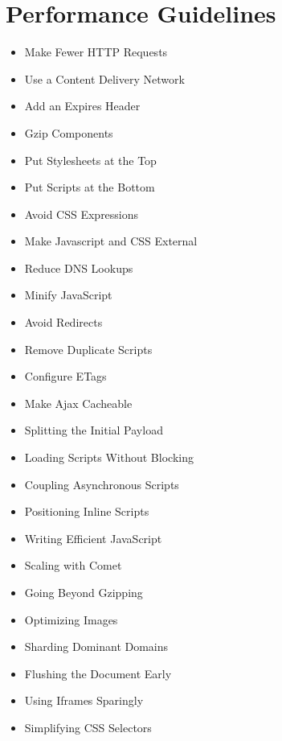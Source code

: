\section{Performance Guidelines}
\label{section:performance-guidelines}

\begin{itemize}
\item Make Fewer HTTP Requests
\item Use a Content Delivery Network
\item Add an Expires Header
\item Gzip Components
\item Put Stylesheets at the Top
\item Put Scripts at the Bottom
\item Avoid CSS Expressions
\item Make Javascript and CSS External
\item Reduce DNS Lookups
\item Minify JavaScript
\item Avoid Redirects
\item Remove Duplicate Scripts
\item Configure ETags
\item Make Ajax Cacheable
\item Splitting the Initial Payload
\item Loading Scripts Without Blocking
\item Coupling Asynchronous Scripts
\item Positioning Inline Scripts
\item Writing Efficient JavaScript
\item Scaling with Comet
\item Going Beyond Gzipping
\item Optimizing Images
\item Sharding Dominant Domains
\item Flushing the Document Early
\item Using Iframes Sparingly
\item Simplifying CSS Selectors
\end{itemize}
